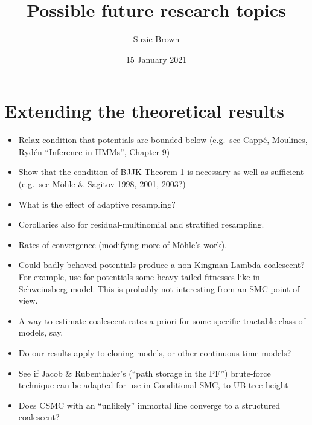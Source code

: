 \documentclass{article}
\title{Possible future research topics}
\author{Suzie Brown}
\date{15 January 2021}
\begin{document}
\maketitle
\thispagestyle{fancy}

\section*{Extending the theoretical results}
\begin{itemize}
\item Relax condition that potentials are bounded below (e.g.\ see Capp\'e, Moulines, Ryd\'en ``Inference in HMMs'', Chapter 9)
\item Show that the condition of BJJK Theorem 1 is necessary as well as sufficient (e.g.\ see M\"ohle \& Sagitov 1998, 2001, 2003?)
\item What is the effect of adaptive resampling?
\item Corollaries also for residual-multinomial and stratified resampling.
\item Rates of convergence (modifying more of M\"ohle's work).
\item Could badly-behaved potentials produce a non-Kingman Lambda-coalescent? For example, use for potentials some heavy-tailed fitnesses like in Schweinsberg model. This is probably not interesting from an SMC point of view.
\item A way to estimate coalescent rates a priori for some specific tractable class of models, say.
\item Do our results apply to cloning models, or other continuous-time models?
\item See if Jacob \& Rubenthaler's (``path storage in the PF'') brute-force technique can be adapted for use in Conditional SMC, to UB tree height
\item Does CSMC with an ``unlikely'' immortal line converge to a structured coalescent?
\end{itemize}
\end{document}
